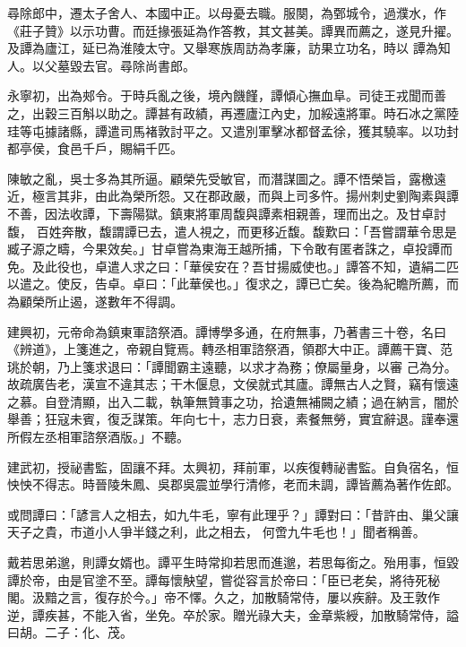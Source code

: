 \begin{pinyinscope}
 尋除郎中，遷太子舍人、本國中正。以母憂去職。服闋，為鄄城令，過濮水，作《莊子贊》以示功曹。而廷掾張延為作答教，其文甚美。譚異而薦之，遂見升擢。及譚為廬江，延已為淮陵太守。又舉寒族周訪為孝廉，訪果立功名，時以
 譚為知人。以父墓毀去官。尋除尚書郎。



 永寧初，出為郟令。于時兵亂之後，境內饑饉，譚傾心撫血阜。司徒王戎聞而善之，出穀三百斛以助之。譚甚有政績，再遷廬江內史，加綏遠將軍。時石冰之黨陸珪等屯據諸縣，譚遣司馬褚敦討平之。又遣別軍擊冰都督孟徐，獲其驍率。以功封都亭侯，食邑千戶，賜絹千匹。



 陳敏之亂，吳士多為其所逼。顧榮先受敏官，而潛謀圖之。譚不悟榮旨，露檄遠近，極言其非，由此為榮所怨。又在郡政嚴，而與上司多忤。揚州刺史劉陶素與譚不善，因法收譚，下壽陽獄。鎮東將軍周馥與譚素相親善，理而出之。及甘卓討馥，
 百姓奔散，馥謂譚已去，遣人視之，而更移近馥。馥歎曰：「吾嘗謂華令思是臧子源之疇，今果效矣。」甘卓嘗為東海王越所捕，下令敢有匿者誅之，卓投譚而免。及此役也，卓遣人求之曰：「華侯安在？吾甘揚威使也。」譚答不知，遺絹二匹以遣之。使反，告卓。卓曰：「此華侯也。」復求之，譚已亡矣。後為紀瞻所薦，而為顧榮所止遏，遂數年不得調。



 建興初，元帝命為鎮東軍諮祭酒。譚博學多通，在府無事，乃著書三十卷，名曰《辨道》，上箋進之，帝親自覽焉。轉丞相軍諮祭酒，領郡大中正。譚薦干寶、范珧於朝，乃上箋求退曰：「譚聞霸主遠聽，以求才為務；僚屬量身，以審
 己為分。故疏廣告老，漢宣不違其志；干木偃息，文侯就式其廬。譚無古人之賢，竊有懷遠之慕。自登清顯，出入二載，執筆無贊事之功，拾遺無補闕之績；過在納言，闇於舉善；狂寇未賓，復乏謀策。年向七十，志力日衰，素餐無勞，實宜辭退。謹奉還所假左丞相軍諮祭酒版。」不聽。



 建武初，授祕書監，固讓不拜。太興初，拜前軍，以疾復轉祕書監。自負宿名，恒怏怏不得志。時晉陵朱鳳、吳郡吳震並學行清修，老而未調，譚皆薦為著作佐郎。



 或問譚曰：「諺言人之相去，如九牛毛，寧有此理乎？」譚對曰：「昔許由、巢父讓天子之貴，市道小人爭半錢之利，此之相去，
 何啻九牛毛也！」聞者稱善。



 戴若思弟邈，則譚女婿也。譚平生時常抑若思而進邈，若思每銜之。殆用事，恒毀譚於帝，由是官塗不至。譚每懷觖望，嘗從容言於帝曰：「臣已老矣，將待死秘閣。汲黯之言，復存於今。」帝不懌。久之，加散騎常侍，屢以疾辭。及王敦作逆，譚疾甚，不能入省，坐免。卒於家。贈光祿大夫，金章紫綬，加散騎常侍，謚曰胡。二子：化、茂。




\end{pinyinscope}
